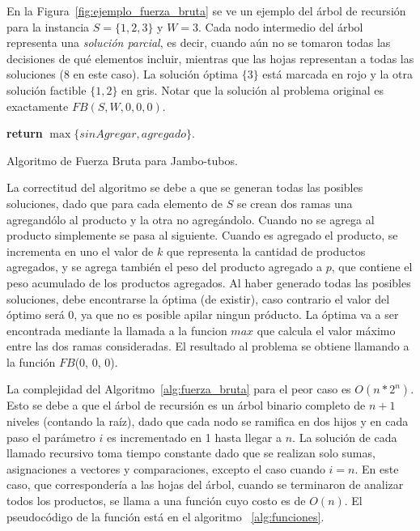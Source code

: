 \documentclass[10pt,a4paper]{article}
\begin{document}
En la Figura~\ref{fig:ejemplo_fuerza_bruta} se ve un ejemplo del árbol de recursión para la instancia $S =\{1, 2, 3\}$ y $W=3$. Cada nodo intermedio del árbol representa una \emph{solución parcial}, es decir, cuando aún no se tomaron todas las decisiones de qué elementos incluir, mientras que las hojas representan a todas las soluciones (8 en este caso). La solución óptima $\{3\}$ está marcada en rojo y la otra solución factible $\{1, 2\}$ en gris. Notar que la solución al problema original es exactamente $FB(S, W, 0, 0, 0)$.

\begin{algorithm}
\begin{algorithmic}[1]
    \EndIf
    \State \textbf{return} $\max \{ sinAgregar,agregado \}$.
\EndFunction
\end{algorithmic}
\caption{Algoritmo de Fuerza Bruta para Jambo-tubos.}
\label{alg:fuerza_bruta}
\end{algorithm}

La correctitud del algoritmo se debe a que se generan todas las posibles soluciones, dado que para cada elemento de $S$ se crean dos ramas una agregandólo al producto y la otra no agregándolo. Cuando no se agrega al producto simplemente se pasa al siguiente. Cuando es agregado el producto, se incrementa en uno el valor de $k$ que representa la cantidad de productos agregados, y se agrega también el peso del producto agregado a $p$, que contiene el peso acumulado de los productos agregados. Al haber generado todas las posibles soluciones, debe encontrarse la óptima (de existir), caso contrario el valor del óptimo será $0$, ya que no es posible apilar ningun próducto. La óptima va a ser encontrada mediante la llamada a la funcion $max$ que calcula el valor máximo entre las dos ramas consideradas. El resultado al problema se obtiene llamando a la función $FB$($0$, $0$, $0$).

La complejidad del Algoritmo~\ref{alg:fuerza_bruta} para el peor caso es $O(n*2^n)$. Esto se debe a que el árbol de recursión es un árbol binario completo de $n+1$ niveles (contando la raíz), dado que cada nodo se ramifica en dos hijos y en cada paso el parámetro $i$ es incrementado en 1 hasta llegar a $n$. La solución de cada llamado recursivo toma tiempo constante dado que se realizan solo sumas, asignaciones a vectores y comparaciones, excepto el caso cuando $i = n$. En este caso, que correspondería a las hojas del árbol, cuando se terminaron de analizar todos los productos, se llama a una función cuyo costo es de $O(n)$. El pseudocódigo de la función está en el algoritmo ~\ref{alg:funciones}.
\end{document}
